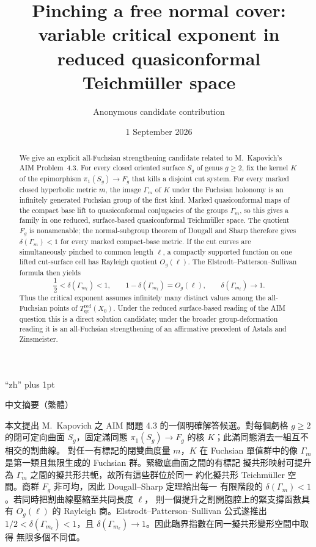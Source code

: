 \documentclass[11pt]{article}
\title{\textbf{Pinching a free normal cover:\\
variable critical exponent in reduced quasiconformal Teichm\"uller space}}
\author{Anonymous candidate contribution}
\date{1 September 2026}
\theoremstyle{definition}
\newcommand{\Tqcred}{T_{\mathrm{qc}}^{\mathrm{red}}}
\begin{document}
\maketitle

\begin{abstract}
We give an explicit all-Fuchsian strengthening candidate related to
M.~Kapovich's AIM Problem~4.3.
For every closed oriented surface $S_g$ of genus $g\ge2$, fix the kernel $K$
of the epimorphism $\pi_1(S_g)\to F_g$ that kills a disjoint cut system.
For every marked closed hyperbolic metric $m$, the image $\Gamma_m$ of $K$
under the Fuchsian holonomy is an infinitely generated Fuchsian group of the
first kind.  Marked quasiconformal maps of the compact base lift to
quasiconformal conjugacies of the groups $\Gamma_m$, so this gives a family in
one reduced, surface-based quasiconformal Teichm\"uller space.  The quotient
$F_g$ is nonamenable;
the normal-subgroup theorem of Dougall and Sharp therefore gives
$\delta(\Gamma_m)<1$ for every marked compact-base metric.  If the cut curves are
simultaneously pinched to common length $\ell$, a compactly supported function
on one lifted cut-surface cell has Rayleigh quotient
$O_g(\ell)$.  The Elstrodt--Patterson--Sullivan formula then yields
\[
 \frac12<\delta(\Gamma_{m_\ell})<1,
 \qquad
 1-\delta(\Gamma_{m_\ell})=O_g(\ell),
 \qquad
 \delta(\Gamma_{m_\ell})\longrightarrow1.
\]
Thus the critical exponent assumes infinitely many distinct values among the
all-Fuchsian points of $\Tqcred(X_0)$.  Under the reduced surface-based reading
of the AIM question this is a direct solution candidate; under the broader
group-deformation reading it is an all-Fuchsian strengthening of an affirmative
precedent of Astala and Zinsmeister.
\end{abstract}

\begingroup
\XeTeXlinebreaklocale ``zh''
\XeTeXlinebreakskip=0pt plus 1pt
\zhfont
\par\bigskip
{\zhfontbold\large 中文摘要（繁體）\par}
\smallskip
本文提出 M.~Kapovich 之 AIM 問題 4.3 的一個明確解答候選。對每個虧格
$g\ge2$ 的閉可定向曲面 $S_g$，固定滿同態
$\pi_1(S_g)\to F_g$ 的核 $K$；此滿同態消去一組互不相交的割曲線。
對任一有標記的閉雙曲度量 $m$，$K$ 在 Fuchsian 單值群中的像
$\Gamma_m$ 是第一類且無限生成的 Fuchsian 群。緊緻底曲面之間的有標記
擬共形映射可提升為 $\Gamma_m$ 之間的擬共形共軛，故所有這些群位於同一
約化擬共形 Teichm\"uller 空間。商群 $F_g$ 非可均，因此 Dougall--Sharp 定理給出每一
有限階段的 $\delta(\Gamma_m)<1$。若同時把割曲線壓縮至共同長度 $\ell$，
則一個提升之割開胞腔上的緊支撐函數具有
$O_g(\ell)$ 的 Rayleigh 商。Elstrodt--Patterson--Sullivan
公式遂推出 $1/2<\delta(\Gamma_{m_\ell})<1$，且
$\delta(\Gamma_{m_\ell})\to1$。因此臨界指數在同一擬共形變形空間中取得
無限多個不同值。
\endgroup
\end{document}
